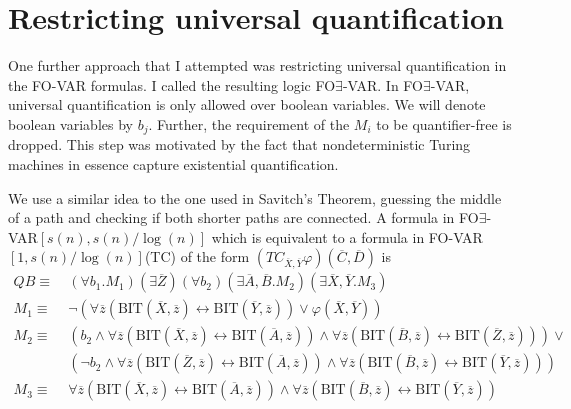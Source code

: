 \section{Restricting universal quantification}\label{sec:restricting-universal-quantification}

One further approach that I attempted was restricting universal quantification in the FO-VAR formulas.
I called the resulting logic FO$\exists$-VAR\@.
In FO$\exists$-VAR, universal quantification is only allowed over boolean variables.
We will denote boolean variables by $b_j$.
Further, the requirement of the $M_i$ to be quantifier-free is dropped.
This step was motivated by the fact that nondeterministic Turing machines in essence capture existential quantification.

We use a similar idea to the one used in Savitch's Theorem, guessing the middle of a path and checking if both shorter paths are connected.
A formula in FO$\exists$-VAR$[s(n), s(n)/\log(n)]$ which is equivalent to a formula in FO-VAR$[1, s(n)/\log(n)]$(TC) of the form $\left( TC_{\overline{X}, \overline{Y}}\varphi \right)(\overline{C}, \overline{D})$ is
\[
    \begin{aligned}
        QB \equiv~& (\forall b_{1}.M_{1})(\exists\overline{Z}) (\forall b_{2})(\exists \overline{A}, \overline{B}.M_{2})(\exists\overline{X}, \overline{Y}.M_{3}) \\
        M_{1} \equiv~& \neg(\forall \overline{z} (\text{BIT}(\overline{X}, \overline{z}) \leftrightarrow \text{BIT}(\overline{Y}, \overline{z})) \lor \varphi(\overline{X}, \overline{Y})) \\
        M_{2} \equiv~&(b_{2} \land \forall \overline{z} (\text{BIT}(\overline{X}, \overline{z}) \leftrightarrow \text{BIT}(\overline{A}, \overline{z}))\land \forall \overline{z} (\text{BIT}(\overline{B}, \overline{z}) \leftrightarrow \text{BIT}(\overline{Z}, \overline{z}))) \lor \\
        &(\neg b_{2} \land \forall \overline{z} (\text{BIT}(\overline{Z}, \overline{z}) \leftrightarrow \text{BIT}(\overline{A}, \overline{z}))\land \forall \overline{z} (\text{BIT}(\overline{B}, \overline{z}) \leftrightarrow \text{BIT}(\overline{Y}, \overline{z}))) \\
        M_{3} \equiv~&\forall \overline{z} (\text{BIT}(\overline{X}, \overline{z}) \leftrightarrow \text{BIT}(\overline{A}, \overline{z}))\land \forall \overline{z} (\text{BIT}(\overline{B}, \overline{z}) \leftrightarrow \text{BIT}(\overline{Y}, \overline{z}))
    \end{aligned}
\]

